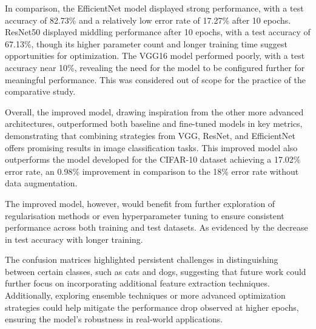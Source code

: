 \documentclass[10pt,twocolumn,letterpaper]{article}
\begin{document}
In comparison, the EfficientNet model displayed strong performance, with a test accuracy of 82.73\% and a relatively low error rate of 17.27\% after 10 epochs. ResNet50 displayed middling performance after 10 epochs, with a test accuracy of 67.13\%, though its higher parameter count and longer training time suggest opportunities for optimization. The VGG16 model performed poorly, with a test accuracy near 10\%, revealing the need for the model to be configured further for meaningful performance. This was considered out of scope for the practice of the comparative study.

Overall, the improved model, drawing inspiration from the other more advanced architectures, outperformed both baseline and fine-tuned models in key metrics, demonstrating that combining strategies from VGG, ResNet, and EfficientNet offers promising results in image classification tasks. This improved model also outperforms the model developed for the CIFAR-10 dataset \cite{cifar10} achieving a 17.02\% error rate, an 0.98\% improvement in comparison to the 18\% error rate without data augmentation.

The improved model, however, would benefit from further exploration of regularisation methods or even hyperparameter tuning to ensure consistent performance across both training and test datasets. As evidenced by the decrease in test accuracy with longer training. 

The confusion matrices highlighted persistent challenges in distinguishing between certain classes, such as cats and dogs, suggesting that future work could further focus on incorporating additional feature extraction techniques. Additionally, exploring ensemble techniques or more advanced optimization strategies could help mitigate the performance drop observed at higher epochs, ensuring the model's robustness in real-world applications.



{\small


}
\end{document}
